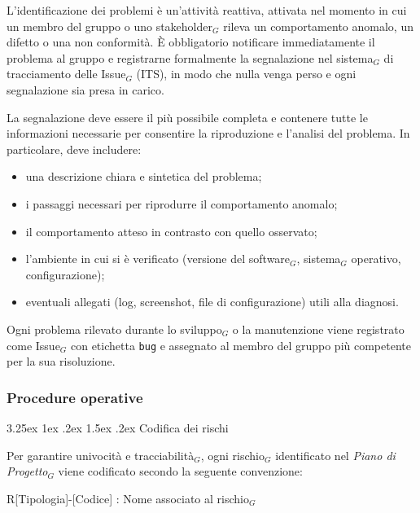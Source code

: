 \documentclass[a4paper, 10pt]{article}
\makeatletter
\renewcommand\paragraph{\@startsection{paragraph}{4}{\z@}%
  {3.25ex \@plus1ex \@minus .2ex}%
  {1.5ex \@plus .2ex}%
  {\normalfont\normalsize\bfseries}}
\makeatother
\begin{document}
L'identificazione dei problemi è un'attività reattiva, attivata nel momento in cui un membro del gruppo o uno stakeholder$_G$ rileva un comportamento anomalo, un difetto o una non conformità. È obbligatorio notificare immediatamente il problema al gruppo e registrarne formalmente la segnalazione nel sistema$_G$ di tracciamento delle Issue$_G$ (ITS), in modo che nulla venga perso e ogni segnalazione sia presa in carico.

La segnalazione deve essere il più possibile completa e contenere tutte le informazioni necessarie per consentire la riproduzione e l'analisi del problema. In particolare, deve includere:
\begin{itemize}
    \item una descrizione chiara e sintetica del problema;
    \item i passaggi necessari per riprodurre il comportamento anomalo;
    \item il comportamento atteso in contrasto con quello osservato;
    \item l'ambiente in cui si è verificato (versione del software$_G$, sistema$_G$ operativo, configurazione);
    \item eventuali allegati (log, screenshot, file di configurazione) utili alla diagnosi.
\end{itemize}

Ogni problema rilevato durante lo sviluppo$_G$ o la manutenzione viene registrato come Issue$_G$ con etichetta \texttt{bug} e assegnato al membro del gruppo più competente per la sua risoluzione.

\subsubsection{Procedure operative}
\label{subsubsec:procedure_risoluzione}

\paragraph{Codifica dei rischi}

Per garantire univocità e tracciabilità$_G$, ogni rischio$_G$ identificato nel \emph{Piano di Progetto}$_G$ viene codificato secondo la seguente convenzione:

R[Tipologia]-[Codice] : Nome associato al rischio$_G$
\end{document}
